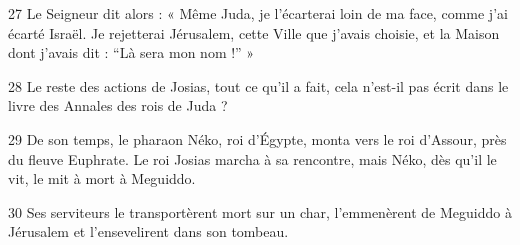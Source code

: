
27 Le Seigneur dit alors : « Même Juda, je l’écarterai loin de ma face, comme j’ai écarté Israël. Je rejetterai Jérusalem, cette Ville que j’avais choisie, et la Maison dont j’avais dit : “Là sera mon nom !” »

28 Le reste des actions de Josias, tout ce qu’il a fait, cela n’est-il pas écrit dans le livre des Annales des rois de Juda ?

29 De son temps, le pharaon Néko, roi d’Égypte, monta vers le roi d’Assour, près du fleuve Euphrate. Le roi Josias marcha à sa rencontre, mais Néko, dès qu’il le vit, le mit à mort à Meguiddo.

30 Ses serviteurs le transportèrent mort sur un char, l’emmenèrent de Meguiddo à Jérusalem et l’ensevelirent dans son tombeau. 